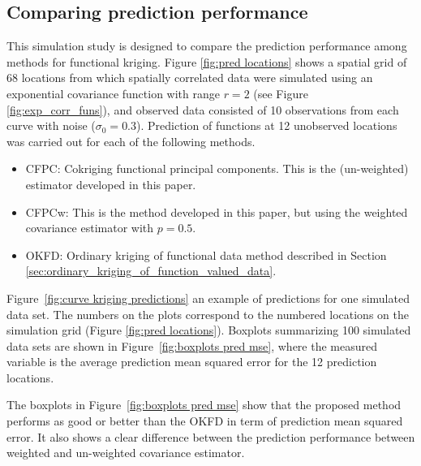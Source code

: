\subsection{Comparing prediction performance} %
\label{sub:comparing_prediction_performance}
This simulation study is designed to compare the prediction performance among methods for functional kriging. Figure \ref{fig:pred locations} shows a spatial grid of 68 locations from which spatially correlated data were simulated using an exponential covariance function with range $r = 2$ (see Figure \ref{fig:exp_corr_funs}), and observed data consisted of 10 observations from each curve with noise ($\sigma_0=0.3$). Prediction of functions at 12 unobserved locations was carried out for each of the following methods.
\begin{itemize}
	\item CFPC: Cokriging functional principal components. This is the (un-weighted) estimator developed in this paper.
	\item CFPCw: This is the method developed in this paper, but using the weighted covariance estimator with $p=0.5$.
	\item OKFD: Ordinary kriging of functional data method described in Section \ref{sec:ordinary_kriging_of_function_valued_data}.
\end{itemize}
Figure~\ref{fig:curve kriging predictions} an example of predictions for one simulated data set. The numbers on the plots correspond to the numbered locations on the simulation grid (Figure \ref{fig:pred locations}). Boxplots summarizing 100 simulated data sets are shown in Figure~\ref{fig:boxplots pred mse}, where the measured variable is the average prediction mean squared error for the 12 prediction locations. 

The boxplots in Figure~\ref{fig:boxplots pred mse} show that the proposed method performs as good or better than the OKFD in term of prediction mean squared error. It also shows a clear difference between the prediction performance between weighted and un-weighted covariance estimator. 
 


